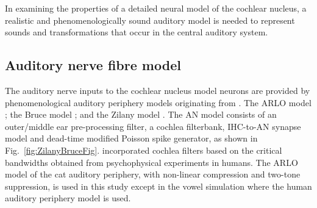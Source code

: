 



%

In examining the properties of a detailed neural model of the cochlear nucleus,
a realistic and phenomenologically sound auditory model is needed to represent
sounds and transformations that occur in the central auditory system.

%
\subsection{Auditory nerve fibre model  \label{sec:CN:resp-audit-models}}

The auditory nerve inputs to the cochlear nucleus model neurons are provided by phenomenological auditory periphery models originating from \citet{Carney:1993}.
The ARLO model \citep{HeinzZhangEtAl:2001}; the Bruce model \citep{BruceSachsEtAl:2003, ZilanyBruce:2006, ZilanyBruce:2007}; and the Zilany model \citep{ZilanyBruceEtAl:2009}.
The AN model consists of an outer\slash middle ear pre-processing filter, a cochlea filterbank, IHC-to-AN synapse model and dead-time modified Poisson spike generator, as shown in Fig.~\ref{fig:ZilanyBruceFig}.
\citet{HeinzZhangEtAl:2001} incorporated cochlea filters based on the critical bandwidths obtained from psychophysical experiments in humans.
The ARLO model of the cat auditory periphery, with non-linear compression and two-tone suppression, is used in this study except in the vowel simulation where the human auditory periphery model is used.



